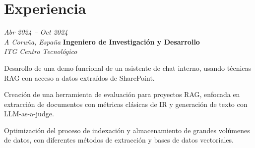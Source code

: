 \section{Experiencia}

\begin{twocolentry}{
    \textit{Abr 2024 – Oct 2024} \\
    \textit{A Coruña, España}}  
    \textbf{Ingeniero de Investigación y Desarrollo} \\
    \textit{ITG Centro Tecnológico}
\end{twocolentry}

\vspace{0.20 cm}
\begin{onecolentry}
    \begin{highlights}
        \item Desarollo de una demo funcional de un asistente de chat interno, usando técnicas RAG con acceso a datos extraídos de SharePoint.
        \item Creación de una herramienta de evaluación para proyectos RAG, enfocada en extracción de documentos con métricas clásicas de IR y generación de texto con LLM-as-a-judge.
        \item Optimización del proceso de indexación y almacenamiento de grandes volúmenes de datos, con diferentes métodos de extracción y bases de datos vectoriales.
    \end{highlights}
\end{onecolentry}